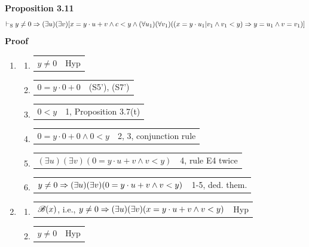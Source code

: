 \textbf{Proposition 3.11}
\[
\vdash_\text{S} y \not = 0 \Rightarrow (\exists u)(\exists v)[x=y \cdot u + v \land c < y \land (\forall u_1)(\forall v_1)((x = y \cdot u_1 | v_1 \land v_1 < y) \Rightarrow y = u_1 \land v = v_1)]
\]
\textbf{Proof}
\begin{enumerate} [label = \roman*.]
    \item \begin{enumerate} [label = \arabic*.]
        \item \begin{tabular}{p{8cm} r}
            $y \not = 0$ & Hyp
            \end{tabular}
        \item \begin{tabular}{p{8cm} r}
            $0 = y \cdot 0 + 0$ & (S5'), (S7')
            \end{tabular}
        \item \begin{tabular}{p{8cm} r}
            $0 < y$ & 1, Proposition 3.7(t)
            \end{tabular}
        \item \begin{tabular}{p{8cm} r}
            $0 = y \cdot 0 + 0 \land 0 < y$ & 2, 3, conjunction rule
            \end{tabular}
        \item \begin{tabular}{p{8cm} r}
            $(\exists u)(\exists v)(0 = y \cdot u + v \land v < y)$ & 4, rule E4 twice
            \end{tabular}
        \item \begin{tabular}{p{8cm} r}
            $y \not = 0 \Rightarrow (\exists u)(\exists v)(0 = y \cdot u + v \land v < y)$ & 1-5, ded. them.
            \end{tabular}
    \end{enumerate}
    \item \begin{enumerate} [label = \arabic*.]
        \item \begin{tabular}{p{8cm} r}
            $\mathscr{B}(x)$, i.e., $y \not = 0 \Rightarrow (\exists u )(\exists v)(x = y \cdot u + v \land v < y)$ & Hyp
            \end{tabular}
        \item \begin{tabular}{p{8cm} r}
            $y \not = 0$ & Hyp

\end{tabular}
\end{enumerate}
\end{enumerate}
